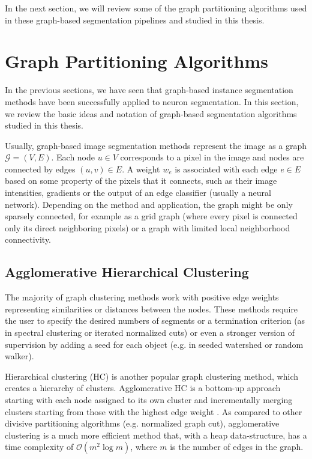 In the next section, we will review some of the graph partitioning algorithms used in these graph-based segmentation pipelines and studied in this thesis.



\section{Graph Partitioning Algorithms}\label{sec:graph_partitioning_intro}
In the previous sections, we have seen that graph-based instance segmentation methods have been successfully applied to neuron segmentation. In this section, we review the basic ideas and notation of graph-based segmentation algorithms studied in this thesis.

Usually, graph-based image segmentation methods represent the image as a graph $\mathcal{G}=(V,E)$. Each node $u\in V$ corresponds to a pixel in the image and nodes are connected by edges $(u,v)\in E$. A weight $w_e$ is associated with each edge $e \in E$ based on some property of the pixels that it connects, such as their image intensities, gradients or the output of an edge classifier (usually a neural network). Depending on the method and application, the graph might be only sparsely connected, for example as a grid graph (where every pixel is connected only its direct neighboring pixels) or a graph with limited local neighborhood connectivity.

\subsection{Agglomerative Hierarchical Clustering}
The majority of graph clustering methods work with positive edge weights representing similarities or distances between the nodes. These methods require the user to specify the desired numbers of segments or a termination criterion (as in spectral clustering or iterated normalized cuts) or even a stronger version of supervision by adding a seed for each object (e.g. in seeded watershed or random walker).  

Hierarchical clustering (HC) is another popular graph clustering method, which creates a hierarchy of clusters. Agglomerative HC is a bottom-up approach starting with each node assigned to its own cluster and incrementally merging clusters starting from those with the highest edge weight \cite{lance1967general}. As compared to other divisive partitioning algorithms (e.g. normalized graph cut), agglomerative clustering is a much more efficient method that, with a heap data-structure, has a time complexity of $\mathcal{O}(m^2 \log m)$, where $m$ is the number of edges in the graph. 

